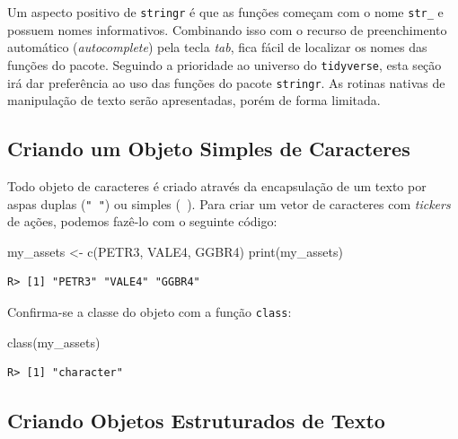 \documentclass[
  11pt,
]{book}
\newenvironment{Shaded}{\begin{snugshade}}{\end{snugshade}}
\newcommand{\FunctionTok}[1]{\textcolor[rgb]{0,0,0}{#1}}
\newcommand{\NormalTok}[1]{#1}
\newcommand{\OtherTok}[1]{\textcolor[rgb]{0.37,0.37,0.37}{#1}}
\newcommand{\StringTok}[1]{\textcolor[rgb]{0.5,0.5,0.5}{#1}}
\begin{document}
Um aspecto positivo de \texttt{stringr} é que as funções começam com o nome \texttt{str\_} e possuem nomes informativos. Combinando isso com o recurso de preenchimento automático (\emph{autocomplete}) pela tecla \emph{tab}, fica fácil de localizar os nomes das funções do pacote. Seguindo a prioridade ao universo do \texttt{tidyverse}, esta seção irá dar preferência ao uso das funções do pacote \texttt{stringr}. As rotinas nativas de manipulação de texto serão apresentadas, porém de forma limitada. 

\hypertarget{criando-um-objeto-simples-de-caracteres}{%
\subsection{Criando um Objeto Simples de Caracteres}\label{criando-um-objeto-simples-de-caracteres}}

Todo objeto de caracteres é criado através da encapsulação de um texto por aspas duplas (\texttt{"\ "}) ou simples (\texttt{\textquotesingle{}\ \textquotesingle{}}). Para criar um vetor de caracteres com \emph{tickers} de ações, podemos fazê-lo com o seguinte código:

\begin{Shaded}
\begin{Highlighting}[]
\NormalTok{my\_assets }\OtherTok{\textless{}{-}} \FunctionTok{c}\NormalTok{(}\StringTok{\textquotesingle{}PETR3\textquotesingle{}}\NormalTok{, }\StringTok{\textquotesingle{}VALE4\textquotesingle{}}\NormalTok{, }\StringTok{\textquotesingle{}GGBR4\textquotesingle{}}\NormalTok{)}
\FunctionTok{print}\NormalTok{(my\_assets)}
\end{Highlighting}
\end{Shaded}

\begin{verbatim}
R> [1] "PETR3" "VALE4" "GGBR4"
\end{verbatim}

Confirma-se a classe do objeto com a função \texttt{class}:

\begin{Shaded}
\begin{Highlighting}[]
\FunctionTok{class}\NormalTok{(my\_assets)}
\end{Highlighting}
\end{Shaded}

\begin{verbatim}
R> [1] "character"
\end{verbatim}

\hypertarget{criando-objetos-estruturados-de-texto}{%
\subsection{Criando Objetos Estruturados de Texto}\label{criando-objetos-estruturados-de-texto}}
\end{document}
